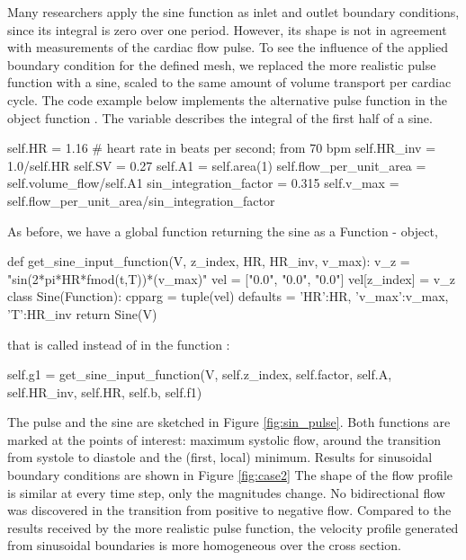 Many researchers apply the sine function as inlet and outlet boundary conditions, since its integral is zero over one period. However, its shape is not in agreement with measurements of the cardiac flow pulse. To see the influence of the applied boundary condition for the defined mesh, we replaced the more realistic pulse function with a sine, scaled to the same amount of volume transport per cardiac cycle. The code example below implements the alternative pulse function in the object function . The variable  describes the integral of the first half of a sine.
\begin{python}
self.HR = 1.16 # heart rate in beats per second; from 70 bpm
self.HR_inv = 1.0/self.HR
self.SV = 0.27
self.A1 = self.area(1)
self.flow_per_unit_area = self.volume_flow/self.A1
sin_integration_factor = 0.315
self.v_max = self.flow_per_unit_area/sin_integration_factor
\end{python}
As before, we have a global function returning the sine as a Function - object,
\begin{python}
def get_sine_input_function(V, z_index, HR, HR_inv, v_max):
	v_z = "sin(2*pi*HR*fmod(t,T))*(v_max)"
	vel = ["0.0", "0.0", "0.0"]
	vel[z_index] = v_z
	class Sine(Function):
		cpparg = tuple(vel)
		defaults = {'HR':HR, 'v_max':v_max, 'T':HR_inv}
	return Sine(V)
\end{python}
that is called instead of  in the function :
\begin{python}
self.g1 = get_sine_input_function(V, self.z_index, self.factor, self.A, self.HR_inv, self.HR, self.b, self.f1)
\end{python}



The pulse and the sine are sketched in Figure \ref{fig:sin_pulse}. Both functions are marked at the points of interest: maximum systolic flow, around the transition from systole to diastole and the (first, local) minimum. Results for sinusoidal boundary conditions are shown in Figure \ref{fig:case2} The shape of the flow profile is similar at every time step, only the magnitudes change. No bidirectional flow was discovered in the transition from positive to negative flow. Compared to the results received by the more realistic pulse function, the velocity profile generated from sinusoidal boundaries is more homogeneous over the cross section.




